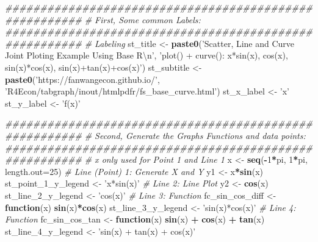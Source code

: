 \documentclass[
]{book}
\newenvironment{Shaded}{\begin{snugshade}}{\end{snugshade}}
\newcommand{\CharTok}[1]{\textcolor[rgb]{0.31,0.60,0.02}{#1}}
\newcommand{\CommentTok}[1]{\textcolor[rgb]{0.56,0.35,0.01}{\textit{#1}}}
\newcommand{\ControlFlowTok}[1]{\textcolor[rgb]{0.13,0.29,0.53}{\textbf{#1}}}
\newcommand{\DataTypeTok}[1]{\textcolor[rgb]{0.13,0.29,0.53}{#1}}
\newcommand{\DecValTok}[1]{\textcolor[rgb]{0.00,0.00,0.81}{#1}}
\newcommand{\KeywordTok}[1]{\textcolor[rgb]{0.13,0.29,0.53}{\textbf{#1}}}
\newcommand{\NormalTok}[1]{#1}
\newcommand{\OperatorTok}[1]{\textcolor[rgb]{0.81,0.36,0.00}{\textbf{#1}}}
\newcommand{\StringTok}[1]{\textcolor[rgb]{0.31,0.60,0.02}{#1}}
\begin{document}
\begin{Shaded}
\begin{Highlighting}[]
\CommentTok{#######################################################}
\CommentTok{# First, Some common Labels:}
\CommentTok{#######################################################}
\CommentTok{# Labeling}
\NormalTok{st_title <-}\StringTok{ }\KeywordTok{paste0}\NormalTok{(}\StringTok{'Scatter, Line and Curve Joint Ploting Example Using Base R}\CharTok{\textbackslash{}n}\StringTok{'}\NormalTok{,}
                   \StringTok{'plot() + curve(): x*sin(x), cos(x), sin(x)*cos(x), sin(x)+tan(x)+cos(x)'}\NormalTok{)}
\NormalTok{st_subtitle <-}\StringTok{ }\KeywordTok{paste0}\NormalTok{(}\StringTok{'https://fanwangecon.github.io/'}\NormalTok{,}
                      \StringTok{'R4Econ/tabgraph/inout/htmlpdfr/fs_base_curve.html'}\NormalTok{)}
\NormalTok{st_x_label <-}\StringTok{ 'x'}
\NormalTok{st_y_label <-}\StringTok{ 'f(x)'}

\CommentTok{#######################################################}
\CommentTok{# Second, Generate the Graphs Functions and data points:}
\CommentTok{#######################################################}
\CommentTok{# x only used for Point 1 and Line 1}
\NormalTok{x <-}\StringTok{ }\KeywordTok{seq}\NormalTok{(}\OperatorTok{-}\DecValTok{1}\OperatorTok{*}\NormalTok{pi, }\DecValTok{1}\OperatorTok{*}\NormalTok{pi, }\DataTypeTok{length.out=}\DecValTok{25}\NormalTok{)}
\CommentTok{# Line (Point) 1: Generate X and Y}
\NormalTok{y1 <-}\StringTok{ }\NormalTok{x}\OperatorTok{*}\KeywordTok{sin}\NormalTok{(x)}
\NormalTok{st_point_}\DecValTok{1}\NormalTok{_y_legend <-}\StringTok{ 'x*sin(x)'}
\CommentTok{# Line 2: Line Plot}
\NormalTok{y2 <-}\StringTok{ }\KeywordTok{cos}\NormalTok{(x)}
\NormalTok{st_line_}\DecValTok{2}\NormalTok{_y_legend <-}\StringTok{ 'cos(x)'}
\CommentTok{# Line 3: Function}
\NormalTok{fc_sin_cos_diff <-}\StringTok{ }\ControlFlowTok{function}\NormalTok{(x) }\KeywordTok{sin}\NormalTok{(x)}\OperatorTok{*}\KeywordTok{cos}\NormalTok{(x)}
\NormalTok{st_line_}\DecValTok{3}\NormalTok{_y_legend <-}\StringTok{ 'sin(x)*cos(x)'}
\CommentTok{# Line 4: Function}
\NormalTok{fc_sin_cos_tan <-}\StringTok{ }\ControlFlowTok{function}\NormalTok{(x) }\KeywordTok{sin}\NormalTok{(x) }\OperatorTok{+}\StringTok{ }\KeywordTok{cos}\NormalTok{(x) }\OperatorTok{+}\StringTok{ }\KeywordTok{tan}\NormalTok{(x)}
\NormalTok{st_line_}\DecValTok{4}\NormalTok{_y_legend <-}\StringTok{ 'sin(x) + tan(x) + cos(x)'}


\end{Highlighting}
\end{Shaded}
\end{document}
